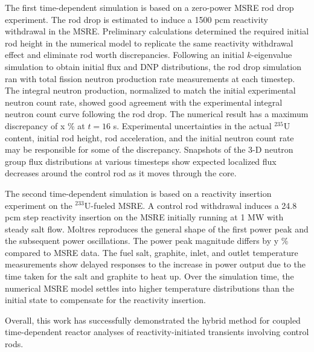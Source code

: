 The first time-dependent simulation is based on a zero-power \gls{MSRE} rod drop experiment. The
rod drop is estimated to induce a 1500 pcm reactivity withdrawal in the \gls{MSRE}. Preliminary
calculations determined the required initial rod height in the numerical model to replicate the
same reactivity withdrawal effect and eliminate rod worth discrepancies. Following an initial
$k$-eigenvalue simulation to obtain initial flux and \gls{DNP} distributions, the rod drop
simulation ran with total fission neutron production rate measurements at each timestep. The
integral neutron production, normalized to match the initial experimental neutron count rate,
showed good agreement with the experimental integral neutron count curve following the rod drop.
The numerical result has a maximum discrepancy of x \% at $t=16$ s. Experimental uncertainties in
the actual $^{235}$U content, initial rod height, rod acceleration, and the initial neutron count
rate may be responsible for some of the discrepancy. Snapshots of the 3-D neutron group flux
distributions at various timesteps show expected localized flux decreases around the control rod
as it moves through the core.

The second time-dependent simulation is based on a reactivity insertion experiment on the
$^{233}$U-fueled \gls{MSRE}. A control rod withdrawal induces a 24.8 pcm step reactivity
insertion on the \gls{MSRE} initially running at 1 MW with steady salt flow. Moltres reproduces
the general shape of the first power peak and the subsequent power oscillations. The power peak
magnitude differs by y \% compared to \gls{MSRE} data. The fuel
salt, graphite, inlet, and outlet temperature measurements show delayed responses to the increase
in power output due to the time taken for the salt and graphite to heat up. Over the simulation
time, the numerical \gls{MSRE} model settles into higher temperature distributions than the initial
state to compensate for the reactivity insertion.

Overall, this work has successfully demonstrated the hybrid method for coupled time-dependent
reactor analyses of reactivity-initiated transients involving control rods.
